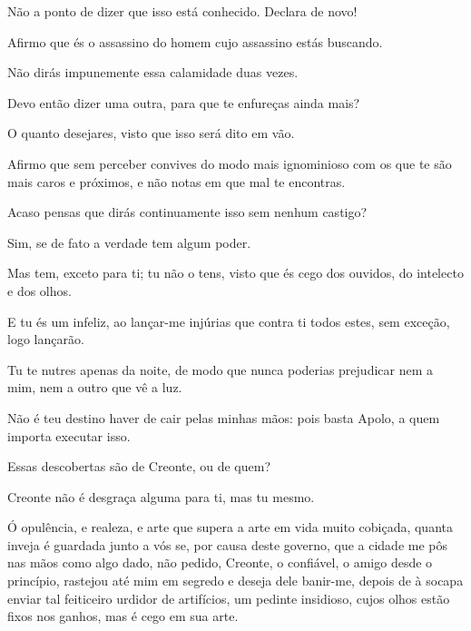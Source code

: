   Não a ponto de dizer que isso está conhecido. Declara de novo!

   Afirmo que és o assassino do homem cujo assassino estás buscando.

   Não dirás impunemente essa calamidade duas vezes.

   Devo então dizer uma outra, para que te enfureças ainda mais?

   O quanto desejares, visto que isso será dito em vão.

   Afirmo que sem perceber convives do modo mais ignominioso com os que te
são mais caros e próximos, e não notas em que mal te encontras.

   Acaso pensas que dirás continuamente isso sem nenhum castigo?

   Sim, se de fato a verdade tem algum poder.

   Mas tem, exceto para ti;  tu não o tens, visto que és cego dos
ouvidos, do intelecto e dos olhos.

   E tu és um infeliz, ao lançar-me injúrias que contra ti todos estes, sem
exceção, logo lançarão.

   Tu te nutres apenas da noite, de modo que nunca poderias prejudicar nem
a mim, nem a outro que vê a luz.

   Não é teu destino haver de cair pelas minhas mãos: pois basta Apolo, a
quem importa executar isso.

   Essas descobertas são de Creonte, ou de quem?

   Creonte não é desgraça alguma para ti, mas tu mesmo.

   Ó opulência, e realeza,  e arte que supera a arte em vida muito
cobiçada, quanta inveja é guardada junto a vós se, por causa deste
governo, que a cidade me pôs nas mãos como algo dado, não pedido,
Creonte, o confiável, o amigo desde o princípio, rastejou até mim em
segredo e deseja dele banir-me, depois de à socapa enviar tal feiticeiro
urdidor de artifícios, um pedinte insidioso, cujos olhos estão fixos nos
ganhos, mas é cego em sua arte.

